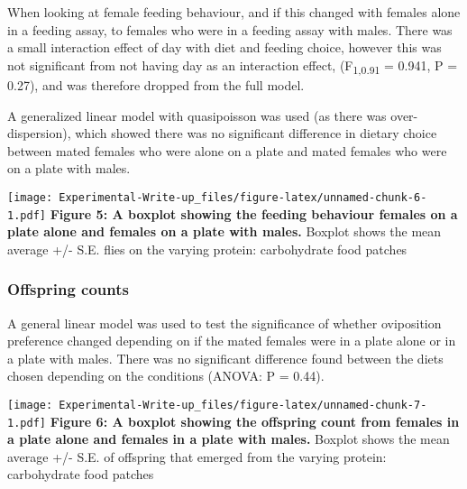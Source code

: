 \documentclass[
]{article}
\begin{document}
When looking at female feeding behaviour, and if this changed with
females alone in a feeding assay, to females who were in a feeding assay
with males. There was a small interaction effect of day with diet and
feeding choice, however this was not significant from not having day as
an interaction effect, (F\textsubscript{1,0.91} = 0.941, P = 0.27), and
was therefore dropped from the full model.

A generalized linear model with quasipoisson was used (as there was
over-dispersion), which showed there was no significant difference in
dietary choice between mated females who were alone on a plate and mated
females who were on a plate with males.

\texttt{[image: Experimental-Write-up\_files/figure-latex/unnamed-chunk-6-1.pdf]}
\textbf{Figure 5: A boxplot showing the feeding behaviour females on a
plate alone and females on a plate with males.} Boxplot shows the mean
average +/- S.E. flies on the varying protein: carbohydrate food patches

\hypertarget{offspring-counts}{%
\subsubsection{Offspring counts}\label{offspring-counts}}

A general linear model was used to test the significance of whether
oviposition preference changed depending on if the mated females were in
a plate alone or in a plate with males. There was no significant
difference found between the diets chosen depending on the conditions
(ANOVA: P = 0.44).

\texttt{[image: Experimental-Write-up\_files/figure-latex/unnamed-chunk-7-1.pdf]}
\textbf{Figure 6: A boxplot showing the offspring count from females in
a plate alone and females in a plate with males.} Boxplot shows the mean
average +/- S.E. of offspring that emerged from the varying protein:
carbohydrate food patches
\end{document}
